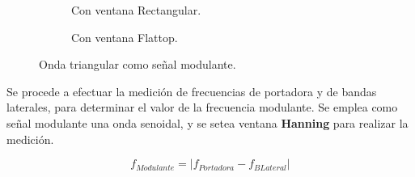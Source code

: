 \begin{figure}[H]
\begin{subfigure}[H]{0.48\textwidth}
          \caption{Con ventana Rectangular.}
          \label{fig:Exp6SeñalFMModulanteTriangularRectangular}
        \end{subfigure}
       \begin{subfigure}[H]{0.48\textwidth}
          \caption{Con ventana Flattop.}
          \label{fig:Exp6SeñalFMModulanteTriangularFlattop}
        \end{subfigure}
        \caption{Onda triangular como señal modulante.}
        \label{fig:Exp6SeñalFMModulanteTriangular}
      \end{figure}         

    Se procede a efectuar la medición de frecuencias de portadora y de bandas 
    laterales, para determinar el valor de la frecuencia modulante. Se emplea como 
    señal modulante una onda senoidal, y se setea ventana \textbf{Hanning} para realizar 
    la medición.

      \begin{equation}
        f_{Modulante}=|f_{Portadora}-f_{BLateral}|
        \label{eqn:Exp6CalculoModulante}
      \end{equation}

